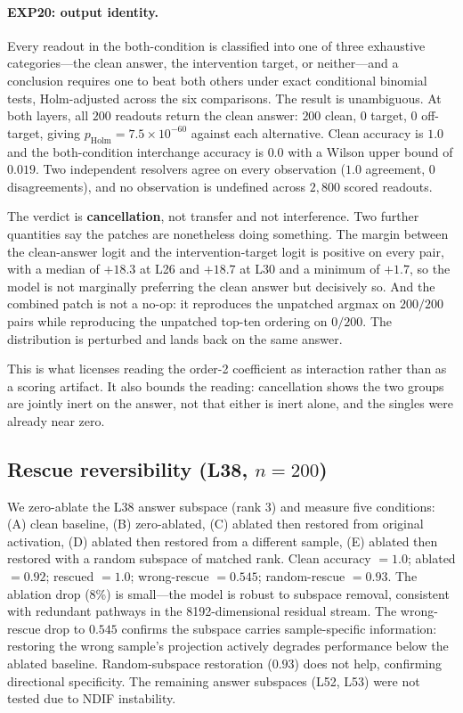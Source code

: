 \documentclass{article}
\begin{document}
\paragraph{EXP20: output identity.}
Every readout in the both-condition is classified into one of three exhaustive categories---the
clean answer, the intervention target, or neither---and a conclusion requires one to beat both
others under exact conditional binomial tests, Holm-adjusted across the six comparisons. The
result is unambiguous. At both layers, all $200$ readouts return the clean answer: $200$ clean,
$0$ target, $0$ off-target, giving $p_{\text{Holm}} = 7.5 \times 10^{-60}$ against each
alternative. Clean accuracy is $1.0$ and the both-condition interchange accuracy is $0.0$ with a
Wilson upper bound of $0.019$. Two independent resolvers agree on every observation
($1.0$ agreement, $0$ disagreements), and no observation is undefined across $2{,}800$ scored
readouts.

The verdict is \textbf{cancellation}, not transfer and not interference. Two further quantities
say the patches are nonetheless doing something. The margin between the clean-answer logit and
the intervention-target logit is positive on every pair, with a median of $+18.3$ at L26 and
$+18.7$ at L30 and a minimum of $+1.7$, so the model is not marginally preferring the clean
answer but decisively so. And the combined patch is not a no-op: it reproduces the unpatched
argmax on $200/200$ pairs while reproducing the unpatched top-ten ordering on $0/200$. The
distribution is perturbed and lands back on the same answer.

This is what licenses reading the order-2 coefficient as interaction rather than as a scoring
artifact. It also bounds the reading: cancellation shows the two groups are jointly
inert on the answer, not that either is inert alone, and the singles were already near zero.

\subsection{Rescue reversibility (L38, $n = 200$)}

We zero-ablate the L38 answer subspace (rank 3) and measure five conditions: (A) clean baseline, (B) zero-ablated, (C) ablated then restored from original activation, (D) ablated then restored from a different sample, (E) ablated then restored with a random subspace of matched rank. Clean accuracy $= 1.0$; ablated $= 0.92$; rescued $= 1.0$; wrong-rescue $= 0.545$; random-rescue $= 0.93$. The ablation drop (8\%) is small---the model is robust to subspace removal, consistent with redundant pathways in the 8192-dimensional residual stream. The wrong-rescue drop to $0.545$ confirms the subspace carries sample-specific information: restoring the wrong sample's projection actively degrades performance below the ablated baseline. Random-subspace restoration ($0.93$) does not help, confirming directional specificity. The remaining answer subspaces (L52, L53) were not tested due to NDIF instability.
\end{document}
